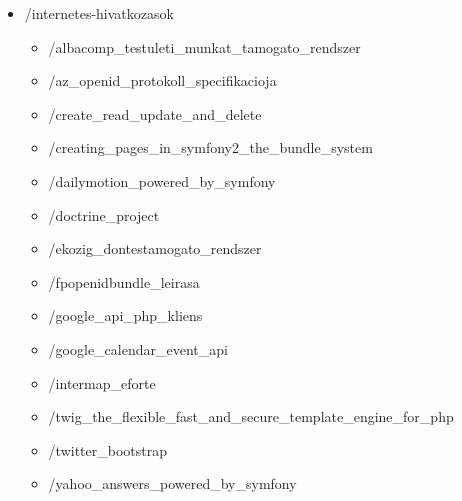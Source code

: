 \documentclass[a4paper,12pt,oneside]{report}
\begin{document}
\begin{itemize}
	\item[] /internetes-hivatkozasok
		\begin{itemize}
			\item[] /albacomp\_testuleti\_munkat\_tamogato\_rendszer
			\item[] /az\_openid\_protokoll\_specifikacioja
			\item[] /create\_read\_update\_and\_delete
			\item[] /creating\_pages\_in\_symfony2\_the\_bundle\_system
			\item[] /dailymotion\_powered\_by\_symfony
			\item[] /doctrine\_project
			\item[] /ekozig\_dontestamogato\_rendszer
			\item[] /fpopenidbundle\_leirasa
			\item[] /google\_api\_php\_kliens
			\item[] /google\_calendar\_event\_api
			\item[] /intermap\_eforte
			\item[] /twig\_the\_flexible\_fast\_and\_secure\_template\_engine\_for\_php
			\item[] /twitter\_bootstrap
			\item[] /yahoo\_answers\_powered\_by\_symfony
		\end{itemize}
\end{itemize}
\end{document}
